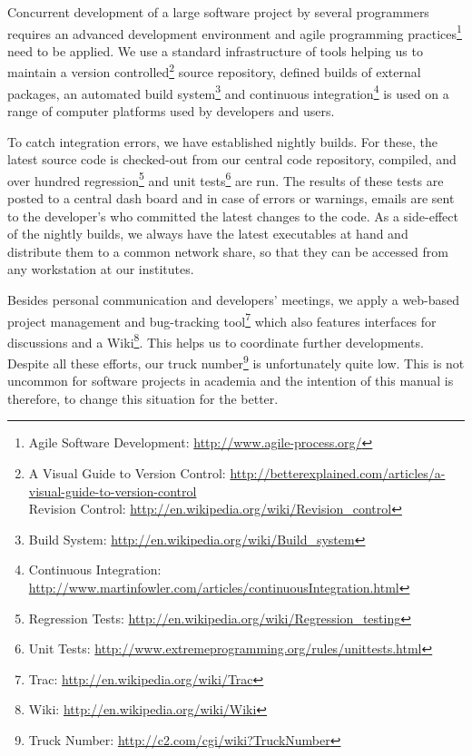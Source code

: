Concurrent  development of  a large  software project  by  several programmers
requires   an   advanced  development   environment   and  agile   programming
practices\footnote{Agile                 Software                 Development:
\url{http://www.agile-process.org/}} need  to be  applied.  We use  a standard
infrastructure of tools helping us to maintain a version controlled\footnote{A
Visual             Guide            to             Version            Control:
\url{http://betterexplained.com/articles/a-visual-guide-to-version-control}\\Revision
Control:      \url{http://en.wikipedia.org/wiki/Revision_control}}      source
repository,  defined   builds  of   external  packages,  an   automated  build
system\footnote{Build System: \url{http://en.wikipedia.org/wiki/Build_system}}
and        continuous       integration\footnote{Continuous       Integration:
\url{http://www.martinfowler.com/articles/continuousIntegration.html}} is used
on a range of computer platforms used by developers and users.

 To catch integration  errors, we have established nightly  builds. For these,
the  latest source  code  is  checked-out from  our  central code  repository,
compiled,    and    over    hundred   regression\footnote{Regression    Tests:
\url{http://en.wikipedia.org/wiki/Regression_testing}}         and        unit
tests\footnote{Unit                                                      Tests:
\url{http://www.extremeprogramming.org/rules/unittests.html}}  are  run.   The
results of  these tests  are posted  to a central  dash board  and in  case of
errors  or warnings,  emails are  sent to  the developer's  who  committed the
latest changes to the code. As  a side-effect of the nightly builds, we always
have the  latest executables at hand  and distribute them to  a common network
share, so that they can be accessed from any workstation at our institutes.

  Besides  personal  communication  and   developers'  meetings,  we  apply  a
web-based    project   management    and    bug-tracking   tool\footnote{Trac:
\url{http://en.wikipedia.org/wiki/Trac}}  which also  features  interfaces for
discussions               and               a              Wiki\footnote{Wiki:
\url{http://en.wikipedia.org/wiki/Wiki}}. This helps  us to coordinate further
developments.   Despite  all these  efforts,  our truck  number\footnote{Truck
Number:   \url{http://c2.com/cgi/wiki?TruckNumber}}  is   unfortunately  quite
low. This is not uncommon for  software projects in academia and the intention
of this manual is therefore, to change this situation for the better.


